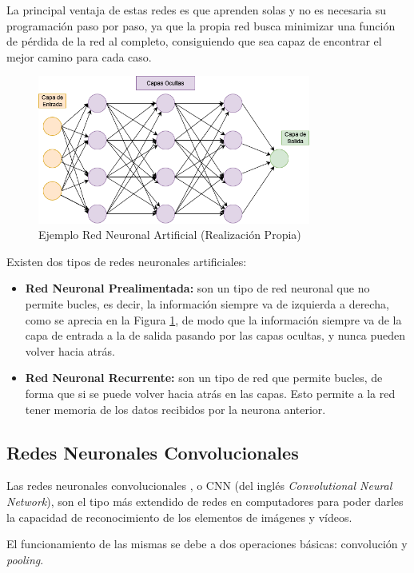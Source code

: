 La principal ventaja de estas redes es que aprenden solas y no es necesaria su programación paso por paso, ya que la propia red busca minimizar una función de pérdida de la red al completo, consiguiendo que sea capaz de encontrar el mejor camino para cada caso.

\begin{figure}[h]
 \centering
  \includegraphics[width=0.8\textwidth]{img/RedNeuronal.png}
 \caption{Ejemplo Red Neuronal Artificial (Realización Propia)}
 \label{f:redneuronal}
\end{figure}

Existen dos tipos de redes neuronales artificiales:
\begin{itemize}
    \item \textbf{Red Neuronal Prealimentada:} son un tipo de red neuronal que no permite bucles, es decir, la información siempre va de izquierda a derecha, como se aprecia en la Figura \ref{f:redneuronal}, de modo que la información siempre va de la capa de entrada a la de salida pasando por las capas ocultas, y nunca pueden volver hacia atrás.
    \item \textbf{Red Neuronal Recurrente:} son un tipo de red que permite bucles, de forma que si se puede volver hacia atrás en las capas. Esto permite a la red tener memoria de los datos recibidos por la neurona anterior.
\end{itemize}

\subsection{Redes Neuronales Convolucionales}
Las redes neuronales convolucionales \cite{castilla2021reconocimiento}, o CNN (del inglés \emph{Convolutional Neural Network}), son el tipo más extendido de redes en computadores para poder darles la capacidad de reconocimiento de los elementos de imágenes y vídeos.

El funcionamiento de las mismas se debe a dos operaciones básicas: convolución y \emph{pooling}.

